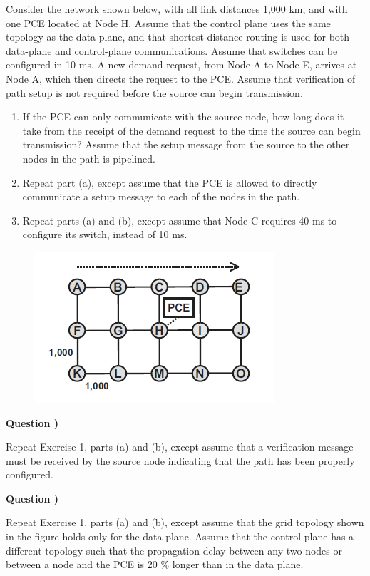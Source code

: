 \documentclass[a4paper]{article}
\newcounter{QuestionNumber}
\newcommand{\Q}{
\textbf{Question \theQuestionNumber)}
\stepcounter{QuestionNumber}
}
\begin{document}
Consider the network shown below, with all link distances 1,000 km, and with
one PCE located at Node H. Assume that the control plane uses the same topology
as the data plane, and that shortest distance routing is used for both data-plane
and control-plane communications. Assume that switches can be configured in
10 ms. A new demand request, from Node A to Node E, arrives at Node A, which
then directs the request to the PCE. Assume that verification of path setup is
not required before the source can begin transmission.
\begin{enumerate}[label=\alph*-]
\item
If the PCE can only communicate with the source node, how long does it take from the receipt of the
demand request to the time the source can begin transmission? Assume that the
setup message from the source to the other nodes in the path is pipelined.
\item
Repeat part (a), except assume that the PCE is allowed to directly communicate a
setup message to each of the nodes in the path.
\item
Repeat parts (a) and (b), except
assume that Node C requires 40 ms to configure its switch, instead of 10 ms.
\end{enumerate}
\begin{figure}[h!]
\centering
\includegraphics{Q1.PNG}
\end{figure}

\Q

Repeat Exercise 1, parts (a) and (b), except assume that a verification message
must be received by the source node indicating that the path has been
properly configured.

\Q

Repeat Exercise 1, parts (a) and (b), except assume that the grid topology
shown in the figure holds only for the data plane. Assume that the control plane
has a different topology such that the propagation delay between any two nodes
or between a node and the PCE is 20 \% longer than in the data plane.
\end{document}
